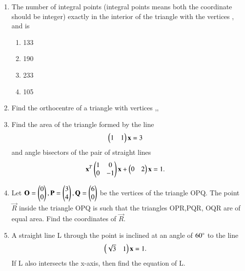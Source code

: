 \begin{enumerate}[label=\arabic*.,ref=\thesubsection.\theenumi]
    \item The number of integral points (integral points means both the coordinate should be integer) exactly in the interior of the triangle with the vertices  ,  and   is 
    \begin{enumerate}
     \item 133
     \item 190
     \item 233
     \item 105
     \end{enumerate}
    \item Find the orthocentre of a triangle with vertices   ,, 
    \item Find the area of the triangle formed by the line \begin{align} \begin{pmatrix}1 & 1\end{pmatrix} \mathbf {x} &= 3\end{align} and angle bisectors of the pair of straight lines \begin{align}\mathbf{x}^T \begin{pmatrix}1 & 0 \\ 0 & -1\end{pmatrix} \mathbf {x} + \begin{pmatrix}0 & 2\end{pmatrix} \mathbf {x} &= 1.\end{align}
    \item Let $\mathbf{O}= \begin{pmatrix}0\\0\end{pmatrix}, \mathbf{P}=\begin{pmatrix}3\\4\end{pmatrix}, \mathbf{Q}= \begin{pmatrix}6\\0\end{pmatrix}$  be the vertices of the triangle OPQ. The point $\vec{R}$ inside the triangle OPQ is such that the triangles OPR,PQR, OQR are of equal area. Find the coordinates of $\vec{R}$.
    \item A straight line L through the point  is inclined at an angle of $60\degree$ to the line\begin{align} \begin{pmatrix}\sqrt{3} & 1\end{pmatrix} \mathbf {x} &= 1.\end{align} If L also intersects the x-axis, then find the equation of L.
%


\end{enumerate}
